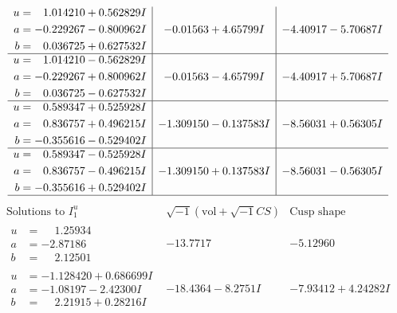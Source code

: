 \documentclass[1p]{elsarticle_modified}
\theoremstyle{definition}
\newcommand{\I}{\sqrt{-1}}
\begin{document}
$$\begin{array}{c|c|c}
\begin{aligned}
u &= \phantom{-}1.014210 + 0.562829 I \\
a &= -0.229267 - 0.800962 I \\
b &= \phantom{-}0.036725 + 0.627532 I\end{aligned}
 & -0.01563 + 4.65799 I & -4.40917 - 5.70687 I \\ \hline\begin{aligned}
u &= \phantom{-}1.014210 - 0.562829 I \\
a &= -0.229267 + 0.800962 I \\
b &= \phantom{-}0.036725 - 0.627532 I\end{aligned}
 & -0.01563 - 4.65799 I & -4.40917 + 5.70687 I \\ \hline\begin{aligned}
u &= \phantom{-}0.589347 + 0.525928 I \\
a &= \phantom{-}0.836757 + 0.496215 I \\
b &= -0.355616 - 0.529402 I\end{aligned}
 & -1.309150 - 0.137583 I & -8.56031 + 0.56305 I \\ \hline\begin{aligned}
u &= \phantom{-}0.589347 - 0.525928 I \\
a &= \phantom{-}0.836757 - 0.496215 I \\
b &= -0.355616 + 0.529402 I\end{aligned}
 & -1.309150 + 0.137583 I & -8.56031 - 0.56305 I\\
 \hline 
 \end{array}$$\newpage$$\begin{array}{c|c|c}  
\text{Solutions to }I^u_{1}& \I (\text{vol} + \sqrt{-1}CS) & \text{Cusp shape}\\
 \hline 
\begin{aligned}
u &= \phantom{-}1.25934\phantom{ +0.000000I} \\
a &= -2.87186\phantom{ +0.000000I} \\
b &= \phantom{-}2.12501\phantom{ +0.000000I}\end{aligned}
 & -13.7717\phantom{ +0.000000I} & -5.12960\phantom{ +0.000000I} \\ \hline\begin{aligned}
u &= -1.128420 + 0.686699 I \\
a &= -1.08197 - 2.42300 I \\
b &= \phantom{-}2.21915 + 0.28216 I\end{aligned}
 & -18.4364 - 8.2751 I & -7.93412 + 4.24282 I \\ \hline\begin{aligned}

\end{aligned}
\end{array}$$
\end{document}
